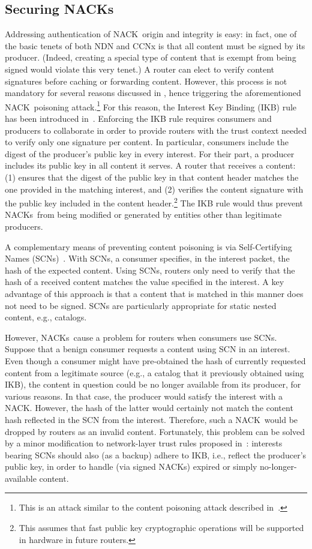 \documentclass[conference]{IEEEtran}
\newcommand{\cnack}{\mbox{\sf {\cal c}NACK}}
\newcommand{\cnacks}{\mbox{\sf {\cal c}NACK}s}
\begin{document}
\subsection{Securing \cnacks}
Addressing authentication of \cnack\ origin and integrity is easy: in fact, one of the basic tenets 
of both NDN and CCNx is that all content
must be signed by its producer. (Indeed, creating a special type of content that is exempt from
being signed would violate this very tenet.) A router can elect to verify content signatures before caching 
or forwarding content. However, this process is not mandatory for several reasons 
discussed in \cite{ghali2014network}, hence triggering the aforementioned \cnack\ poisoning 
attack.\footnote{This is an attack similar to the content poisoning attack 
described in~\cite{ghali2014needle}.} For this reason, the Interest Key 
Binding (IKB) rule has been introduced in~\cite{ghali2014network}. Enforcing the IKB rule
requires consumers and producers to collaborate in order to provide routers with 
the trust context needed to verify only one signature per content. In particular, consumers include the digest of 
the producer's public key in every interest. For their part, 
a  producer includes its public key in all content it serves. A router that receives a content: 
(1) ensures that the digest of the public key in that content header matches the one provided in the matching interest, 
and (2) verifies the content signature with the public key included in the content header.\footnote{This 
assumes that fast public key cryptographic operations will be supported in
hardware in future routers.} The IKB rule would thus prevent \cnacks\ from being modified or generated by 
entities other than legitimate producers.

A complementary means of preventing content poisoning is via  
Self-Certifying Names (SCNs)~\cite{ghali2014network}. With SCNs, a consumer specifies, 
in the interest packet, the hash of the expected 
content. Using SCNs, routers only need to verify that the hash of a received content matches the value 
specified in the interest. A key advantage of this approach is that a content that is matched in this 
manner does not need to be signed. SCNs are particularly appropriate for static nested content, e.g., catalogs.

However, \cnacks\ cause a problem for routers when consumers use SCNs. Suppose that a benign consumer
requests a content using SCN in an interest. Even though a consumer might have pre-obtained the hash of currently 
requested content from a legitimate source (e.g., a catalog that it previously obtained using IKB), the content
in question could be no longer available from its producer, for various reasons. 
In that case, the producer would satisfy the interest with a \cnack. However, the hash of the latter 
would certainly not match the content hash reflected in the SCN from the interest. Therefore, 
such a \cnack\ would be dropped by routers as an invalid content. 
Fortunately, this problem can be solved by a minor modification to network-layer trust
rules proposed in~\cite{ghali2014network}: interests bearing SCNs should also (as a backup)
adhere to IKB, i.e., reflect the producer's public key, in order to handle (via signed \cnacks) 
expired or simply no-longer-available content.
\end{document}
